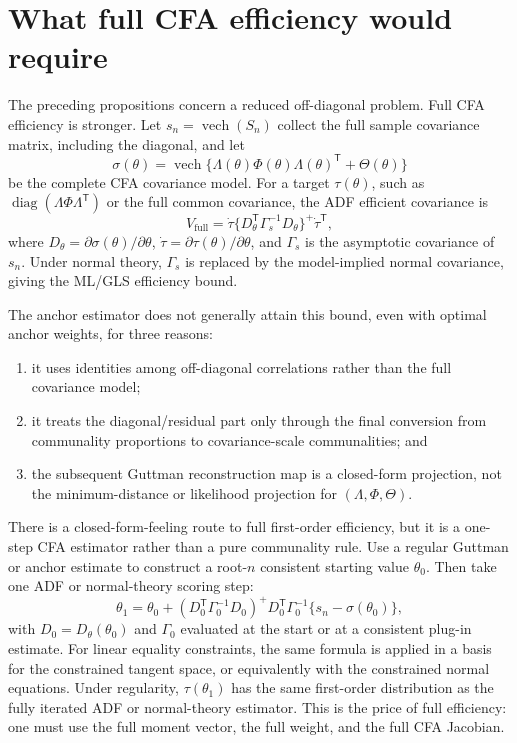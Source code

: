 \documentclass[11pt]{article}
\newcommand{\T}{^{\mathsf T}}
\newcommand{\diag}{\operatorname{diag}}
\newcommand{\vech}{\operatorname{vech}}
\theoremstyle{plain}
\theoremstyle{remark}
\begin{document}
\section{What full CFA efficiency would require}

The preceding propositions concern a reduced off-diagonal problem. Full CFA
efficiency is stronger. Let \(s_n=\vech(S_n)\) collect the full sample
covariance matrix, including the diagonal, and let
\[
  \sigma(\theta)=\vech\{\Lambda(\theta)\Phi(\theta)\Lambda(\theta)\T
    +\Theta(\theta)\}
\]
be the complete CFA covariance model. For a target
\(\tau(\theta)\), such as \(\diag(\Lambda\Phi\Lambda\T)\) or the full common
covariance, the ADF efficient covariance is
\[
  V_{\mathrm{full}}
  =
  \dot\tau
  \{D_\theta\T\Gamma_s^{-1}D_\theta\}^{+}
  \dot\tau\T ,
\]
where \(D_\theta=\partial\sigma(\theta)/\partial\theta\),
\(\dot\tau=\partial\tau(\theta)/\partial\theta\), and \(\Gamma_s\) is the
asymptotic covariance of \(s_n\). Under normal theory, \(\Gamma_s\) is replaced
by the model-implied normal covariance, giving the ML/GLS efficiency bound.

The anchor estimator does not generally attain this bound, even with optimal
anchor weights, for three reasons:
\begin{enumerate}
\item it uses identities among off-diagonal correlations rather than the full
  covariance model;
\item it treats the diagonal/residual part only through the final conversion
  from communality proportions to covariance-scale communalities; and
\item the subsequent Guttman reconstruction map is a closed-form projection,
  not the minimum-distance or likelihood projection for
  \((\Lambda,\Phi,\Theta)\).
\end{enumerate}

There is a closed-form-feeling route to full first-order efficiency, but it is a
one-step CFA estimator rather than a pure communality rule. Use a regular
Guttman or anchor estimate to construct a root-\(n\) consistent starting value
\(\theta_0\). Then take one ADF or normal-theory scoring step:
\begin{equation}\label{eq:one-step-full}
  \theta_1
  =
  \theta_0
  +
  (D_0\T\Gamma_0^{-1}D_0)^{+}
  D_0\T\Gamma_0^{-1}\{s_n-\sigma(\theta_0)\},
\end{equation}
with \(D_0=D_\theta(\theta_0)\) and \(\Gamma_0\) evaluated at the start or at a
consistent plug-in estimate. For linear equality constraints, the same formula
is applied in a basis for the constrained tangent space, or equivalently with
the constrained normal equations. Under regularity, \(\tau(\theta_1)\) has the
same first-order distribution as the fully iterated ADF or normal-theory
estimator. This is the price of full efficiency: one must use the full moment
vector, the full weight, and the full CFA Jacobian.
\end{document}
